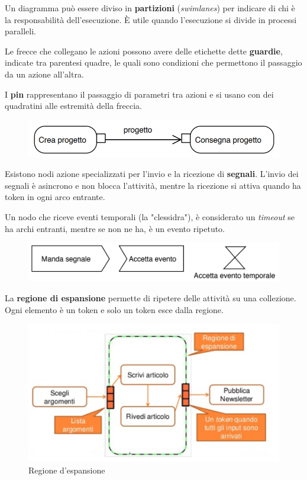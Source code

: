 Un diagramma può essere diviso in \textbf{partizioni} (\textit{swimlanes}) per indicare di chi è la responsabilità dell'esecuzione. 
\`E utile quando l'esecuzione si divide in processi paralleli.

Le frecce che collegano le azioni possono avere delle etichette dette \textbf{guardie}, indicate tra parentesi quadre, le quali sono condizioni che permettono il passaggio da un azione all'altra.

I \textbf{pin} rappresentano il passaggio di parametri tra azioni e si usano con dei quadratini alle estremità della freccia.
\begin{figure}[H]
\centering
    \includegraphics[scale=0.5]{res/img/pin}
\end{figure}

Esistono nodi azione specializzati per l'invio e la ricezione di \textbf{segnali}.
L'invio dei segnali è asincrono e non blocca l'attività, mentre la ricezione si attiva quando ha token in ogni arco entrante.

Un nodo che riceve eventi temporali (la "clessidra"), è considerato un \textit{timeout} se ha archi entranti, mentre se non ne ha, è un evento ripetuto.
\begin{figure}[H]
\centering
    \includegraphics[scale=0.5]{res/img/segnali}
\end{figure}

La \textbf{regione di espansione} permette di ripetere delle attività su una collezione. 
Ogni elemento è un token e solo un token esce dalla regione.
\begin{figure}[H]
\centering
    \includegraphics[scale=0.5]{res/img/regioneEspansione}
    \caption{Regione d'espansione}
\end{figure}

